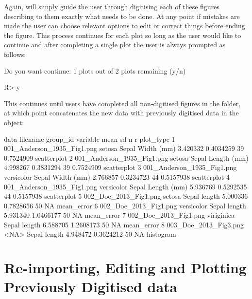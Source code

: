 \documentclass[article]{jss}
\newcommand{\fct}[1]{\code{#1()}}
\begin{document}
Again, \fct{metaDigitise} will simply guide the user through digitising each of these figures describing to them exactly what needs to be done. At any point if mistakes are made the user can choose relevant options to edit or correct things before ending the figure. This process continues for each plot so long as the user would like to continue and after completing a single plot the user is always prompted as follows:

\begin{CodeChunk}
\begin{CodeOutput}
Do you want continue: 1 plots out of 2 plots remaining (y/n)
\end{CodeOutput}
\begin{CodeInput}
R> y
\end{CodeInput}
\end{CodeChunk}

This continues until users have completed all non-digitised figures in the folder, at which point \fct{metaDigitise} concatenates the new data with previously digitised data in the object:

\begin{CodeChunk}
\begin{CodeOutput}
data
               filename        group_id         variable     mean        sd   n         r    plot_type
1 001_Anderson_1935_Fig1.png     setosa  Sepal Width (mm) 3.420332 0.4034259 39 0.7524909 scatterplot
2 001_Anderson_1935_Fig1.png     setosa Sepal Length (mm) 4.998267 0.3831294 39 0.7524909 scatterplot
3 001_Anderson_1935_Fig1.png versicolor  Sepal Width (mm) 2.766857 0.3234723 44 0.5157938 scatterplot
4 001_Anderson_1935_Fig1.png versicolor Sepal Length (mm) 5.936769 0.5292535 44 0.5157938 scatterplot
5      002_Doe_2013_Fig1.png     setosa      Sepal length 5.000336 0.7828656 50        NA  mean_error
6      002_Doe_2013_Fig1.png versicolor      Sepal length 5.931340 1.0466177 50        NA  mean_error
7      002_Doe_2013_Fig1.png viriginica      Sepal length 6.588705 1.2608173 50        NA  mean_error
8      003_Doe_2013_Fig3.png       <NA>      Sepal length 4.948472 0.3624212 50        NA  histogram
\end{CodeOutput}
\end{CodeChunk}






\section{Re-importing, Editing and Plotting Previously Digitised data}
\end{document}
